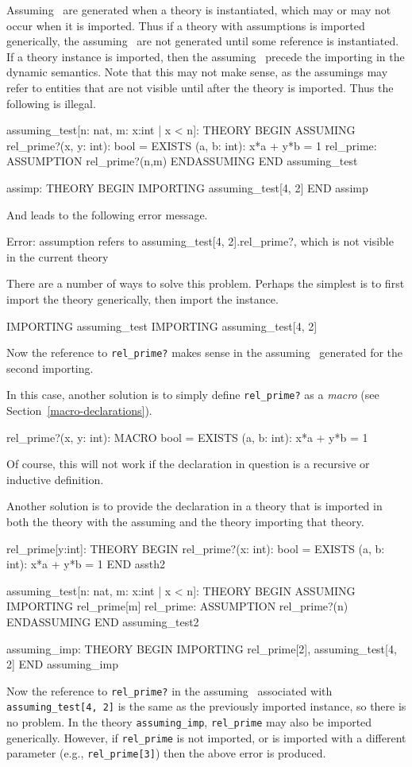 Assuming \tccs\ are generated when a theory is instantiated, which may or
may not occur when it is imported.  Thus if a theory with assumptions is
imported generically, the assuming \tccs\ are not generated until some
reference is instantiated.  If a theory instance is imported, then the
assuming \tccs\ precede the importing in the dynamic semantics.  Note that
this may not make sense, as the assumings may refer to entities that are
not visible until after the theory is imported.  Thus the following is
illegal.
\begin{session}
  assuming_test[n: nat, m: {x:int | x < n}]: THEORY
  BEGIN
   ASSUMING
    rel_prime?(x, y: int): bool = EXISTS (a, b: int): x*a + y*b = 1
    rel_prime: ASSUMPTION rel_prime?(n,m)
   ENDASSUMING
  END assuming_test

  assimp: THEORY
  BEGIN
   IMPORTING assuming_test[4, 2]
  END assimp
\end{session}
And leads to the following error message.
\begin{pvsex}
  Error: assumption refers to 
    assuming_test[4, 2].rel_prime?,
  which is not visible in the current theory
\end{pvsex}
There are a number of ways to solve this problem.  Perhaps the simplest is
to first import the theory generically, then import the instance.
\begin{pvsex}
   IMPORTING assuming_test
   IMPORTING assuming_test[4, 2]
\end{pvsex}
Now the reference to \texttt{rel\_prime?} makes sense in the assuming
\tcc\ generated for the second importing.

In this case, another solution is to simply define \texttt{rel\_prime?} as
a \emph{macro} (see Section~\ref{macro-declarations}).
\begin{pvsex}
  rel_prime?(x, y: int): MACRO bool = EXISTS (a, b: int): x*a + y*b = 1
\end{pvsex}
Of course, this will not work if the declaration in question is a
recursive or inductive definition.

Another solution is to provide the declaration in a theory that is
imported in both the theory with the assuming and the theory importing
that theory.
\begin{session}
  rel_prime[y:int]: THEORY
  BEGIN
   rel_prime?(x: int): bool = EXISTS (a, b: int): x*a + y*b = 1
  END assth2

  assuming_test[n: nat, m: {x:int | x < n}]: THEORY
  BEGIN
   ASSUMING
    IMPORTING rel_prime[m]
    rel_prime: ASSUMPTION rel_prime?(n)
   ENDASSUMING
  END assuming_test2

  assuming_imp: THEORY
  BEGIN
   IMPORTING rel_prime[2], assuming_test[4, 2]
  END assuming_imp
\end{session}
Now the reference to \texttt{rel\_prime?} in the assuming \tcc\ associated
with \texttt{assuming\_test[4, 2]} is the same as the previously imported
instance, so there is no problem.  In the theory \texttt{assuming\_imp},
\texttt{rel\_prime} may also be imported generically.  However, if
\texttt{rel\_prime} is not imported, or is imported with a different
parameter (e.g., \texttt{rel\_prime[3]}) then the above error is produced.


